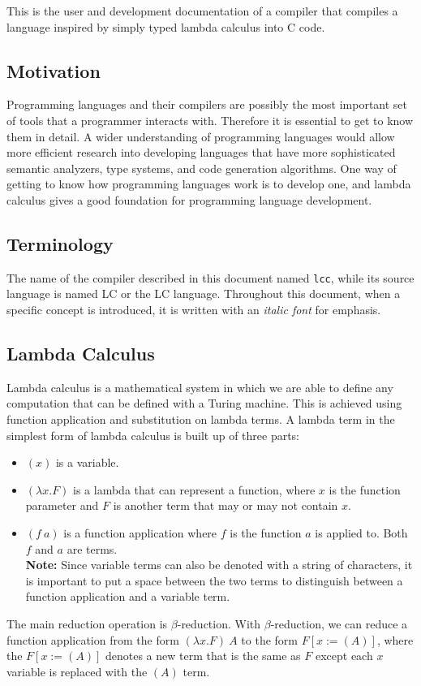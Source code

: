 \documentclass[12pt]{article}
\begin{document}
This is the user and development documentation of a compiler that compiles a
language inspired by simply typed lambda calculus into C code.

\subsection{Motivation}

Programming languages and their compilers are possibly the most important set of
tools that a programmer interacts with. Therefore it is essential to get to know
them in detail. A wider understanding of programming languages would allow more
efficient research into developing languages that have more sophisticated
semantic analyzers, type systems, and code generation algorithms. One way of
getting to know how programming languages work is to develop one, and lambda
calculus gives a good foundation for programming language development.

\subsection{Terminology}

The name of the compiler described in this document named \verb$lcc$, while its
source language is named LC or the LC language. Throughout this document, when a
specific concept is introduced, it is written with an \emph{italic font} for
emphasis.

\subsection{Lambda Calculus}

Lambda calculus is a mathematical system in which we are able to define any
computation that can be defined with a Turing machine. This is achieved using
function application and substitution on lambda terms. A lambda term in the
simplest form of lambda calculus is built up of three parts:
\begin{itemize}
    \item $(x)$ is a variable.
    \item $(\lambda x. F)$ is a lambda that can represent a function, where $x$
        is the function parameter and $F$ is another term that may or 
        may not contain $x$.
    \item $(f\:a)$ is a function application where $f$ is the function $a$ is
        applied to. Both $f$ and $a$ are terms. \\ \textbf{Note:} Since variable
        terms can also be denoted with a string of characters, it is important
        to put a space between the two terms to distinguish between a function
        application and a variable term.
\end{itemize}
The main reduction operation is $\beta$-reduction. With $\beta$-reduction, we
can reduce a function application from the form $(\lambda x. F)\:A$ to the
form $F[x := (A)]$, where the $F[x := (A)]$ denotes a new term that is the same
as $F$ except each $x$ variable is replaced with the $(A)$ term.
\cite{lambda-calculus-wiki}
\end{document}
